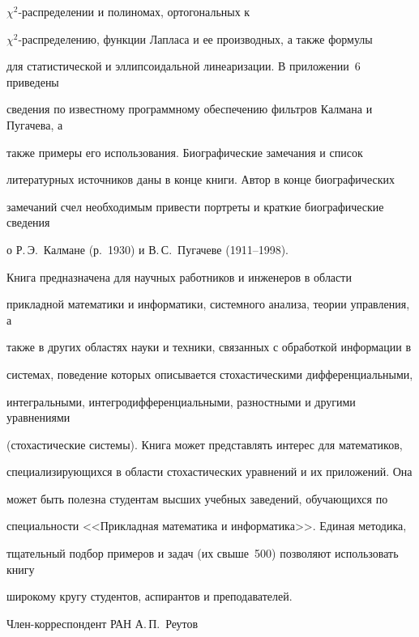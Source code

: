      $\chi^2$-распределении и полиномах, ортогональных к 


     $\chi^2$-распределению, функции Лапласа и ее производных, а также формулы 


для статистической и эллипсоидальной линеаризации. В приложении~6 приведены 


сведения по известному программному обеспечению фильтров Калмана и Пугачева, а 


также примеры его использования. Биографические замечания и список 


литературных источников даны в конце книги. Автор в конце биографических 


замечаний счел необходимым привести портреты и краткие биографические сведения 


о Р.\,Э.~Калмане (р.~1930) и В.\,С.~Пугачеве (1911--1998).


     


     Книга предназначена для научных работников и инженеров в области 


прикладной математики и информатики, системного анализа, теории управления, а 


также в  других областях науки и техники, связанных с обработкой информации в 


системах, поведение которых описывается стохастическими дифференциальными, 


интегральными, интегродифференциальными, разностными и другими уравнениями 


(стохастические системы). Книга может представлять интерес для математиков, 


специализирующихся в области стохастических уравнений и их приложений. Она 


может быть полезна студентам высших учебных заведений, обучающихся по 


специальности <<Прикладная математика и информатика>>. Единая методика, 


тщательный подбор примеров и задач (их свыше~500) позволяют использовать книгу 


широкому кругу студентов, аспирантов и преподавателей.


     \vspace*{12pt}


     


     \hfill Член-корреспондент РАН А.\,П.~Реутов



